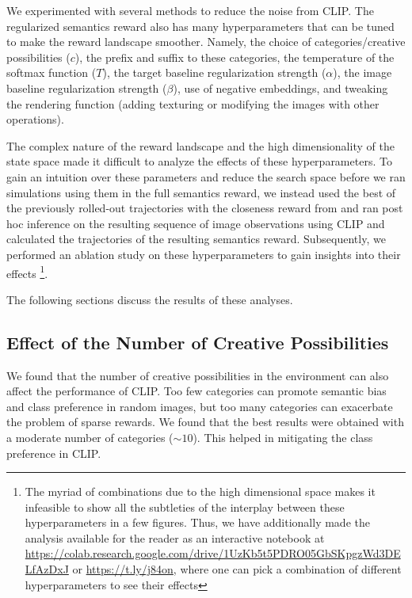 We experimented with several methods to reduce the noise from CLIP.
The regularized semantics reward also has many hyperparameters that can be tuned to make the reward landscape smoother.
Namely, the choice of categories/creative possibilities (\(c\)), the prefix and suffix to these categories, the temperature of the softmax function (\(T\)), the target baseline regularization strength (\(\alpha\)), the image baseline regularization strength (\(\beta\)), use of negative embeddings, and tweaking the rendering function (adding texturing or modifying the images with other operations).

The complex nature of the reward landscape and the high dimensionality of the state space made it difficult to analyze the effects of these hyperparameters.
To gain an intuition over these parameters and reduce the search space before we ran simulations using them in the full semantics reward, we instead used the best of the previously rolled-out trajectories with the closeness reward from  and ran post hoc inference on the resulting sequence of image observations using CLIP and calculated the trajectories of the resulting semantics reward.
Subsequently, we performed an ablation study on these hyperparameters to gain insights into their effects \footnote{The myriad of combinations due to the high dimensional space makes it infeasible to show all the subtleties of the interplay between these hyperparameters in a few figures.
Thus, we have additionally made the analysis available for the reader as an interactive notebook at \url{https://colab.research.google.com/drive/1UzKb5t5PDRO05GbSKpgzWd3DELfAzDxJ} or \url{https://t.ly/j84on}, where one can pick a combination of different hyperparameters to see their effects}.

The following sections discuss the results of these analyses.

\subsection{Effect of the Number of Creative Possibilities}
\label{sec:clip-categories}
We found that the number of creative possibilities in the environment can also affect the performance of CLIP.
Too few categories can promote semantic bias and class preference in random images, but too many categories can exacerbate the problem of sparse rewards.
We found that the best results were obtained with a moderate number of categories (\(\sim 10\)).
This helped in mitigating the class preference in CLIP.

